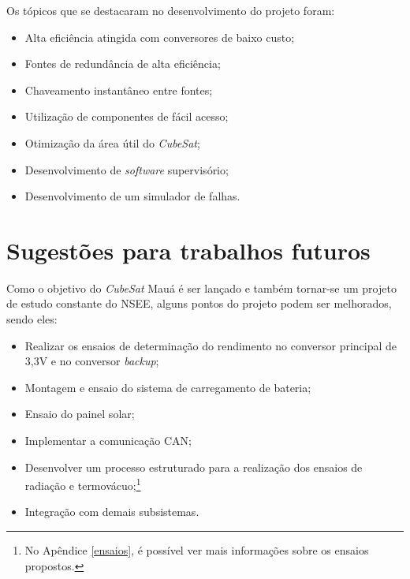 \documentclass[
	12pt,				%
	openright,			%
	oneside,			%
	a4paper,			%
	english,			%
	french,				%
	spanish,			%
	brazil,				%
	oldfontcommands
	]{abntex2}
\begin{document}
	Os tópicos que se destacaram no desenvolvimento do projeto foram:
	
	\begin{itemize}
		\item Alta eficiência atingida com conversores de baixo custo;
		\item Fontes de redundância de alta eficiência;
		\item Chaveamento instantâneo entre fontes;
		\item Utilização de componentes de fácil acesso;
		\item Otimização da área útil do \textit{CubeSat};
		\item Desenvolvimento de \textit{software} supervisório;
		\item Desenvolvimento de um simulador de falhas.
	\end{itemize}

\section[Sugestões para trabalhos futuros]{Sugestões para trabalhos futuros}
	
	Como o objetivo do \textit{CubeSat} Mauá é ser lançado e também tornar-se um projeto de estudo constante do NSEE, alguns pontos do projeto podem ser melhorados, sendo eles:
	
	\begin{itemize}
		\item Realizar os ensaios de determinação do rendimento no conversor principal de 3,3V e no conversor \textit{backup};
		\item Montagem e ensaio do sistema de carregamento de bateria;
		\item Ensaio do painel solar;
		\item Implementar a comunicação CAN;
		\item Desenvolver um processo estruturado para a realização dos ensaios de radiação e termovácuo;\footnote{No Apêndice \ref{ensaios}, é possível ver mais informações sobre os ensaios propostos.}
		\item Integração com demais subsistemas.
	\end{itemize}
	


\end{document}
